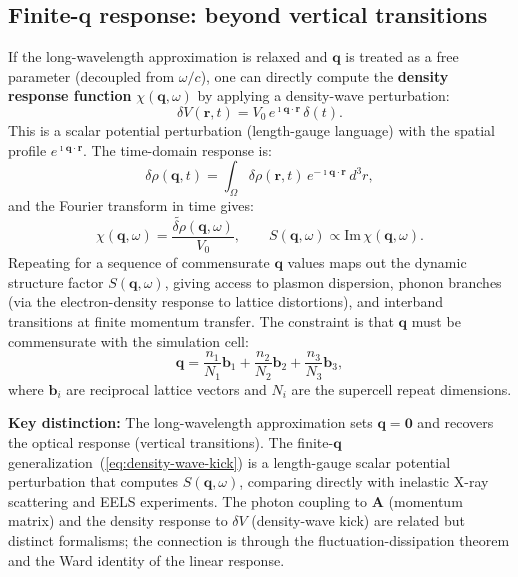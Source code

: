 \documentclass[11pt]{article}
\newcommand{\iunit}{\imath}          %
\newcommand{\Avec}{\mathbf{A}}
\begin{document}
\subsection{Finite-q response: beyond vertical transitions}

If the long-wavelength approximation is relaxed and $\mathbf{q}$
is treated as a free parameter (decoupled from $\omega/c$),
one can directly compute the \textbf{density response function}
$\chi(\mathbf{q},\omega)$ by applying a density-wave perturbation:
\begin{equation}
  \delta V(\mathbf{r},t)
  = V_0\,e^{\iunit\mathbf{q}\cdot\mathbf{r}}\,\delta(t).
  \label{eq:density-wave-kick}
\end{equation}
This is a scalar potential perturbation (length-gauge language)
with the spatial profile $e^{\iunit\mathbf{q}\cdot\mathbf{r}}$.
The time-domain response is:
\begin{equation}
  \delta\rho(\mathbf{q},t)
  = \int_\Omega\!
    \delta\rho(\mathbf{r},t)\,
    e^{-\iunit\mathbf{q}\cdot\mathbf{r}}\,d^3r,
\end{equation}
and the Fourier transform in time gives:
\begin{equation}
  \chi(\mathbf{q},\omega)
  = \frac{\widetilde{\delta\rho}(\mathbf{q},\omega)}{V_0},
  \qquad
  S(\mathbf{q},\omega) \propto \mathrm{Im}\,\chi(\mathbf{q},\omega).
  \label{eq:chi-and-S}
\end{equation}
Repeating for a sequence of commensurate $\mathbf{q}$ values
maps out the dynamic structure factor $S(\mathbf{q},\omega)$,
giving access to plasmon dispersion, phonon branches (via the
electron-density response to lattice distortions), and
interband transitions at finite momentum transfer.
The constraint is that $\mathbf{q}$ must be commensurate with
the simulation cell:
\begin{equation}
  \mathbf{q}
  = \frac{n_1}{N_1}\mathbf{b}_1
  + \frac{n_2}{N_2}\mathbf{b}_2
  + \frac{n_3}{N_3}\mathbf{b}_3,
  \label{eq:q-commensurate}
\end{equation}
where $\mathbf{b}_i$ are reciprocal lattice vectors and $N_i$
are the supercell repeat dimensions.

\begin{keyresult}
\textbf{Key distinction:}
The long-wavelength approximation sets $\mathbf{q}=\mathbf{0}$
and recovers the optical response (vertical transitions).
The finite-$\mathbf{q}$ generalization~(\ref{eq:density-wave-kick})
is a length-gauge scalar potential perturbation that computes
$S(\mathbf{q},\omega)$, comparing directly with inelastic
X-ray scattering and EELS experiments.
The photon coupling to $\Avec$ (momentum matrix) and the density
response to $\delta V$ (density-wave kick) are related but
distinct formalisms; the connection is through the fluctuation-dissipation
theorem and the Ward identity of the linear response.
\end{keyresult}
\end{document}
